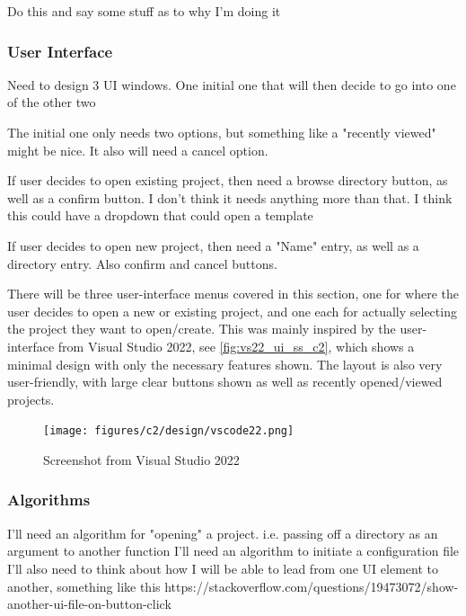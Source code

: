 \documentclass[11pt]{article}
\begin{document}
                Do this and say some stuff as to why I'm doing it

            \subsubsection{User Interface}
                Need to design 3 UI windows. 
                One initial one that will then decide to go into one of the other two 

                The initial one only needs two options, but something like a "recently viewed" might be nice.
                It also will need a cancel option.

                If user decides to open existing project, then need a browse directory button, as well as a confirm button. I don't think it needs anything more than that.
                I think this could have a dropdown that could open a template 
                
                If user decides to open new project, then need a "Name" entry, as well as a directory entry. Also confirm and cancel buttons. 

                There will be three user-interface menus covered in this section, one for where the user decides to open a new or existing project, and one each for actually selecting the project they want to open/create. This was mainly inspired by the user-interface from Visual Studio 2022, see \autoref{fig:vs22_ui_ss_c2}, which shows a minimal design with only the necessary features shown. The layout is also very user-friendly, with large clear buttons shown as well as recently opened/viewed projects.

                \begin{figure}[!ht]
                    \centering
                    \texttt{[image: figures/c2/design/vscode22.png]}
                    \caption{Screenshot from Visual Studio 2022}
                    \label{fig:vs22_ui_ss_c2}
                \end{figure}

            \subsubsection{Algorithms}
                I'll need an algorithm for "opening" a project. i.e. passing off a directory as an argument to another function
                I'll need an algorithm to initiate a configuration file
                I'll also need to think about how I will be able to lead from one UI element to another, something like this https://stackoverflow.com/questions/19473072/show-another-ui-file-on-button-click
\end{document}
